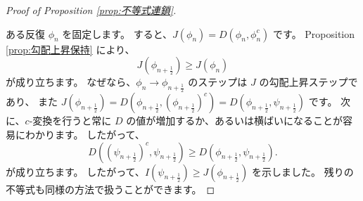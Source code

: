 \documentclass{jsarticle}
\theoremstyle{definition}
\begin{document}
\begin{proof}[Proof of Proposition \ref{prop:不等式連鎖}]
  \hypertarget{proof:prop:不等式連鎖}{}
  ある反復 $\phi_n$ を固定します。
  すると、$J(\phi_n) = D(\phi_n, \phi_n^c)$ です。
  Proposition \ref{prop:勾配上昇保持} により、
  $$
    J(\phi_{n + \frac{1}{2}}) \geq J(\phi_n)
  $$
  が成り立ちます。
  なぜなら、$\phi_n \to \phi_{n + \frac{1}{2}}$ のステップは $J$ の勾配上昇ステップであり、
  また $J(\phi_{n + \frac{1}{2}}) = D(\phi_{n + \frac{1}{2}}, (\phi_{n + \frac{1}{2}})^c) = D(\phi_{n + \frac{1}{2}}, \psi_{n + \frac{1}{2}})$ です。
  次に、$c$-変換を行うと常に $D$ の値が増加するか、あるいは横ばいになることが容易にわかります。
  したがって、
  $$
    D\left((\psi_{n + \frac{1}{2}})^c, \psi_{n + \frac{1}{2}}\right)\geq D(\phi_{n + \frac{1}{2}}, \psi_{n + \frac{1}{2}}).
  $$
  が成り立ちます。
  したがって、$I(\psi_{n + \frac{1}{2}}) \geq J(\phi_{n + \frac{1}{2}})$ を示しました。
  残りの不等式も同様の方法で扱うことができます。



\end{proof}
\end{document}
